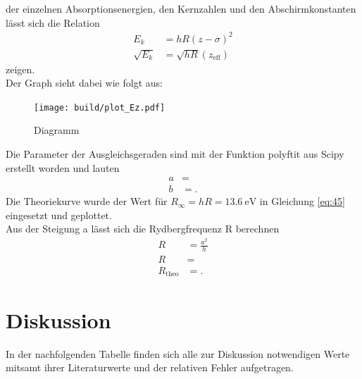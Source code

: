 \justifying der einzelnen Absorptionsenergien, den Kernzahlen und den Abschirmkonstanten
lässt sich die Relation \cite{V602}
\begin{align}
    E_k &= hR (z-\sigma)^2 \label{eq:45}\\
    \sqrt{E_k}&=\sqrt{hR} (z_{\text{eff}} ) \label{eq:46}
\end{align}
zeigen.\\
Der Graph sieht dabei wie folgt aus:
\begin{figure}[H]
    \centering
    \texttt{[image: build/plot\_Ez.pdf]}
    \caption{ Diagramm\cite{matplotlib}}
    \label{fig:10}
\end{figure}
Die Parameter der Ausgleichsgeraden sind mit der Funktion polyftit aus Scipy erstellt
worden und lauten
\begin{align}
    a &= \text{} \label{eq:47} \\
    b &= \text{} \label{eq:48}.
\end{align}
Die Theoriekurve wurde der Wert für $R_{\infty}=hR=\SI{13.6}{\electronvolt} $ in 
Gleichung \eqref{eq:45} eingesetzt und geplottet.\\
Aus der Steigung a lässt sich die Rydbergfrequenz R berechnen
\begin{align}
    R&=\frac{a^2}{h} \label{eq:49}\\
    R&= \text{} \label{eq:50}\\
    R_{\text{theo}}&= \text{} \label{eq:51}.
\end{align}


\section{Diskussion}

In der nachfolgenden Tabelle finden sich alle zur Diskussion notwendigen Werte
mitsamt ihrer Literaturwerte und der relativen Fehler aufgetragen.

